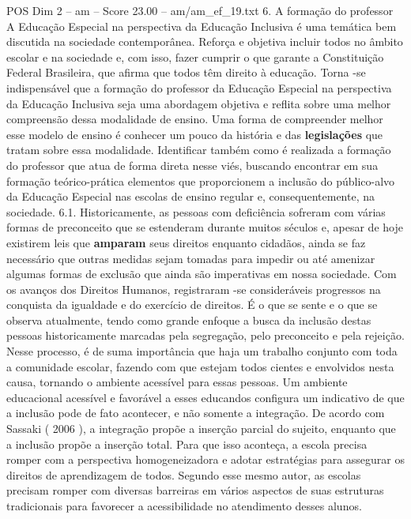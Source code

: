 \begin{textsample}{POS Dim 2 – am – Score 23.00 – am/am\_ef\_19.txt}  \label{ex:f2_pos_157}
6.
A formação do professor A Educação Especial na perspectiva da Educação Inclusiva é uma temática bem discutida na sociedade contemporânea.
Reforça e objetiva incluir todos no âmbito escolar e na sociedade e, com isso, fazer cumprir o que garante a Constituição Federal Brasileira, que afirma que todos têm direito à educação.
Torna -se indispensável que a formação do professor da Educação Especial na perspectiva da Educação Inclusiva seja uma abordagem objetiva e reflita sobre uma melhor compreensão dessa modalidade de ensino.
Uma forma de compreender melhor esse modelo de ensino é conhecer um pouco da história e das \textbf{legislações} que tratam sobre essa modalidade.
Identificar também como é realizada a formação do professor que atua de forma direta nesse viés, buscando encontrar em sua formação teórico-prática elementos que proporcionem a inclusão do público-alvo da Educação Especial nas escolas de ensino regular e, consequentemente, na sociedade. 6.1.
Historicamente, as pessoas com deficiência sofreram com várias formas de preconceito que se estenderam durante muitos séculos e, apesar de hoje existirem leis que \textbf{amparam} seus direitos enquanto cidadãos, ainda se faz necessário que outras medidas sejam tomadas para impedir ou até amenizar algumas formas de exclusão que ainda são imperativas em nossa sociedade.
Com os avanços dos Direitos Humanos, registraram -se consideráveis progressos na conquista da igualdade e do exercício de direitos.
É o que se sente e o que se observa atualmente, tendo como grande enfoque a busca da inclusão destas pessoas historicamente marcadas pela segregação, pelo preconceito e pela rejeição.
Nesse processo, é de suma importância que haja um trabalho conjunto com toda a comunidade escolar, fazendo com que estejam todos cientes e envolvidos nesta causa, tornando o ambiente acessível para essas pessoas.
Um ambiente educacional acessível e favorável a esses educandos configura um indicativo de que a inclusão pode de fato acontecer, e não somente a integração.
De acordo com Sassaki ( 2006 ), a integração propõe a inserção parcial do sujeito, enquanto que a inclusão propõe a inserção total.
Para que isso aconteça, a escola precisa romper com a perspectiva homogeneizadora e adotar estratégias para assegurar os direitos de aprendizagem de todos.
Segundo esse mesmo autor, as escolas precisam romper com diversas barreiras em vários aspectos de suas estruturas tradicionais para favorecer a acessibilidade no atendimento desses alunos.

\end{textsample}

